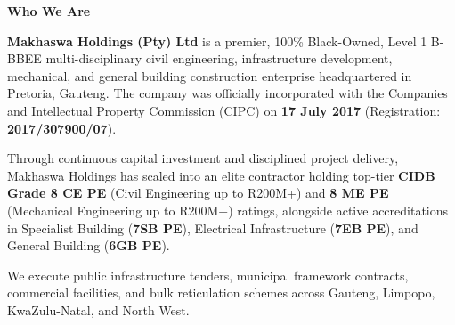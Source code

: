\hypertarget{sec:overview}{}

\noindent
\begin{minipage}[t]{0.62\textwidth}
    {\large\bfseries\color{mhnavy} Who We Are}
    \vspace{0.12cm}

    {\fontsize{9.0pt}{13.0pt}\selectfont\color{mhtext}
    \textbf{Makhaswa Holdings (Pty) Ltd} is a premier, 100\% Black-Owned, Level 1 B-BBEE multi-disciplinary civil engineering, infrastructure development, mechanical, and general building construction enterprise headquartered in Pretoria, Gauteng. The company was officially incorporated with the Companies and Intellectual Property Commission (CIPC) on \textbf{17 July 2017} (Registration: \textbf{2017/307900/07}).
    }

    \vspace{0.22cm}

    {\fontsize{9.0pt}{13.0pt}\selectfont\color{mhtext}
    Through continuous capital investment and disciplined project delivery, Makhaswa Holdings has scaled into an elite contractor holding top-tier \textbf{CIDB Grade 8 CE PE} (Civil Engineering up to R200M+) and \textbf{8 ME PE} (Mechanical Engineering up to R200M+) ratings, alongside active accreditations in Specialist Building (\textbf{7SB PE}), Electrical Infrastructure (\textbf{7EB PE}), and General Building (\textbf{6GB PE}).
    }

    \vspace{0.22cm}

    {\fontsize{9.0pt}{13.0pt}\selectfont\color{mhtext}
    We execute public infrastructure tenders, municipal framework contracts, commercial facilities, and bulk reticulation schemes across Gauteng, Limpopo, KwaZulu-Natal, and North West.
    }
\end{minipage}
\hfill
